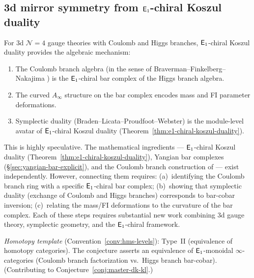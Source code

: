 \subsection{\texorpdfstring{3d mirror symmetry from $\mathsf{E}_1$-chiral Koszul duality}{3d mirror symmetry from E1-chiral Koszul duality}}
\label{subsec:3d-mirror}

\begin{conjecture}\label{conj:3d-mirror}
For 3d $\mathcal{N}=4$ gauge theories with Coulomb and Higgs
branches, $\mathsf{E}_1$-chiral Koszul duality provides the algebraic
mechanism:
\begin{enumerate}[label=\textup{(\roman*)}]
\item The Coulomb branch algebra \textup{(}in the sense of
  Braverman--Finkelberg--Nakajima \cite{BFN18}\textup{)}
  is the $\mathsf{E}_1$-chiral bar complex of the Higgs branch algebra.
\item The curved $A_\infty$ structure on the bar complex
  encodes mass and FI parameter deformations.
\item Symplectic duality \textup{(}Braden--Licata--Proudfoot--Webster\textup{)}
  is the module-level avatar of $\mathsf{E}_1$-chiral Koszul duality
  \textup{(}Theorem~\textup{\ref{thm:e1-chiral-koszul-duality})}.
\end{enumerate}
\end{conjecture}

\begin{remark}[Scope]\label{rem:3d-mirror-scope}
This is highly speculative.  The mathematical ingredients ---
$\mathsf{E}_1$-chiral Koszul duality
(Theorem~\ref{thm:e1-chiral-koszul-duality}), Yangian bar
complexes (\S\ref{sec:yangian-bar-explicit}), and the
Coulomb branch construction of \cite{BFN18} --- exist
independently.  However, connecting them requires: (a)~identifying
the Coulomb branch ring with a specific $\mathsf{E}_1$-chiral bar
complex; (b)~showing that symplectic duality (exchange of Coulomb
and Higgs branches) corresponds to bar-cobar inversion; (c)~relating
the mass/FI deformations to the curvature of the bar complex.
Each of these steps requires substantial new work combining
3d gauge theory, symplectic geometry, and the $\mathsf{E}_1$-chiral
framework.

\emph{Homotopy template} (Convention~\ref{conv:hms-levels}): Type~II (equivalence of homotopy categories).
The conjecture asserts an equivalence of $\mathsf{E}_1$-monoidal $\infty$-categories
(Coulomb branch factorization vs.\ Higgs branch bar-cobar).
(Contributing to Conjecture~\ref{conj:master-dk-kl}.)
\end{remark}

